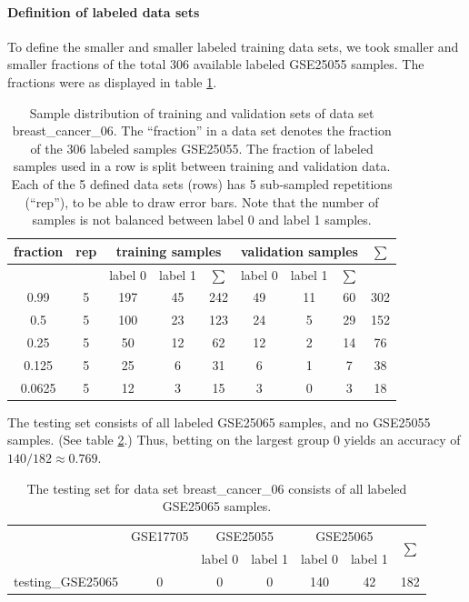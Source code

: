 \paragraph{Definition of labeled data sets}

To define the smaller and smaller labeled training data sets, we took
smaller and smaller fractions of the total 306 available labeled GSE25055
samples. The fractions were as displayed in table \ref{tab:training-and-validation-sets-of-breast_cancer_06}.

\noindent 
\begin{table}
\noindent \begin{centering}
\begin{tabular}{|c|c||c|c|c|c|c|c|c|}
\hline 
fraction & rep & \multicolumn{3}{c|}{training samples} & \multicolumn{3}{c|}{validation samples} & $\sum$\tabularnewline
\hline 
 &  & label 0 & label 1 & $\sum$ & label 0 & label 1 & $\sum$ & \tabularnewline
\hline 
\hline 
0.99 & 5 & 197 & 45 & 242 & 49 & 11 & 60 & 302\tabularnewline
\hline 
0.5 & 5 & 100 & 23 & 123 & 24 & 5 & 29 & 152\tabularnewline
\hline 
0.25 & 5 & 50 & 12 & 62 & 12 & 2 & 14 & 76\tabularnewline
\hline 
0.125 & 5 & 25 & 6 & 31 & 6 & 1 & 7 & 38\tabularnewline
\hline 
0.0625 & 5 & 12 & 3 & 15 & 3 & 0 & 3 & 18\tabularnewline
\hline 
\end{tabular}
\par\end{centering}
\caption[Sample distribution of training and validation sets of breast\_cancer\_06.]{\label{tab:training-and-validation-sets-of-breast_cancer_06}Sample
distribution of training and validation sets of data set breast\_cancer\_06.
The ``fraction'' in a data set denotes the fraction of the 306 labeled
samples GSE25055. The fraction of labeled samples used in a row is
split between training and validation data. Each of the 5 defined
data sets (rows) has 5 sub-sampled repetitions (``rep''), to be
able to draw error bars. Note that the number of samples is not balanced
between label 0 and label 1 samples.}
\end{table}

The testing set consists of all labeled GSE25065 samples, and no GSE25055
samples. (See table \ref{tab:Testing-set-for-breast_cancer_06}.)
Thus, betting on the largest group 0 yields an accuracy of $140/182\approx0.769$.

\noindent 
\begin{table}
\noindent \begin{centering}
\begin{tabular}{|c|c|c|c|c|c||c|}
\hline 
 & GSE17705 & \multicolumn{2}{c|}{GSE25055} & \multicolumn{2}{c||}{GSE25065} & \multirow{2}{*}{$\sum$}\tabularnewline
\cline{1-6} 
 &  & label 0 & label 1 & label 0 & label 1 & \tabularnewline
\hline 
\hline 
testing\_GSE25065 & 0 & 0 & 0 & 140 & 42 & 182\tabularnewline
\hline 
\end{tabular}
\par\end{centering}
\caption{\label{tab:Testing-set-for-breast_cancer_06}The testing set for data
set breast\_cancer\_06 consists of all labeled GSE25065 samples.}
\end{table}

